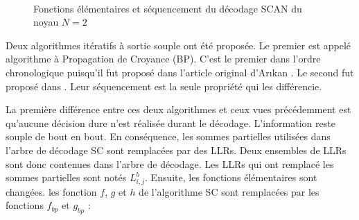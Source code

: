 \begin{figure}[t]
  \renewcommand*\thesubfigure{\arabic{subfigure}} 
  \centering
  \hspace{2.5cm}
  \\
  \hspace{0.5cm}
  \hspace{3.7cm}
  \caption{Fonctions élémentaires et séquencement du décodage SCAN du noyau $N=2$}
  \label{fig:SCANSchedule}
\end{figure}

Deux algorithmes itératifs à sortie souple ont été proposée. Le premier est appelé algorithme à Propagation de Croyance (BP). C'est le premier dans l'ordre chronologique puisqu'il fut proposé dans l'article original d'Ar{\i}kan \cite{arikan_channel_2009}. Le second fut proposé dans \cite{fayyaz_low-complexity_2014}. Leur séquencement est la seule propriété qui les différencie.

La première différence entre ces deux algorithmes et ceux vues précédemment est qu'aucune décision dure n'est réalisée durant le décodage. L'information reste souple de bout en bout.
En conséquence, les sommes partielles utilisées dans l'arbre de décodage SC sont remplacées par des LLRs. Deux ensembles de LLRs sont donc contenues dans l'arbre de décodage. Les LLRs qui ont remplacé les sommes partielles sont notés $L^b_{i,j}$.
Ensuite, les fonctions élémentaires sont changées. les fonction $f$, $g$ et $h$ de l'algorithme SC sont remplacées par les fonctions $f_{bp}$ et $g_{bp}$ :

